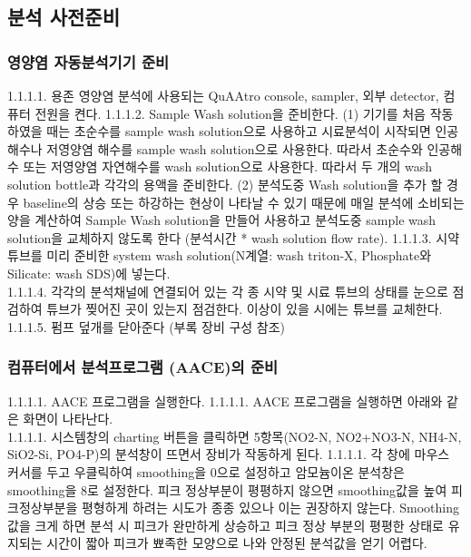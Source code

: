 \documentclass[
]{book}
\begin{document}
\hypertarget{uxbd84uxc11d-uxc0acuxc804uxc900uxbe44}{%
\subsection{분석 사전준비}\label{uxbd84uxc11d-uxc0acuxc804uxc900uxbe44}}

\hypertarget{uxc601uxc591uxc5fc-uxc790uxb3d9uxbd84uxc11duxae30uxae30-uxc900uxbe44}{%
\subsubsection{영양염 자동분석기기 준비}\label{uxc601uxc591uxc5fc-uxc790uxb3d9uxbd84uxc11duxae30uxae30-uxc900uxbe44}}

1.1.1.1. 용존 영양염 분석에 사용되는 QuAAtro console, sampler, 외부 detector, 컴퓨터 전원을 켠다.
1.1.1.2. Sample Wash solution을 준비한다.
(1) 기기를 처음 작동하였을 때는 초순수를 sample wash solution으로 사용하고 시료분석이 시작되면 인공해수나 저영양염 해수를 sample wash solution으로 사용한다. 따라서 초순수와 인공해수 또는 저영양염 자연해수를 wash solution으로 사용한다. 따라서 두 개의 wash solution bottle과 각각의 용액을 준비한다.
(2) 분석도중 Wash solution을 추가 할 경우 baseline의 상승 또는 하강하는 현상이 나타날 수 있기 때문에 매일 분석에 소비되는 양을 계산하여 Sample Wash solution을 만들어 사용하고 분석도중 sample wash solution을 교체하지 않도록 한다 (분석시간 * wash solution flow rate).
1.1.1.3. 시약튜브를 미리 준비한 system wash solution(N계열: wash triton-X, Phosphate와 Silicate: wash SDS)에 넣는다.\\
1.1.1.4. 각각의 분석채널에 연결되어 있는 각 종 시약 및 시료 튜브의 상태를 눈으로 점검하여 튜브가 찢어진 곳이 있는지 점검한다. 이상이 있을 시에는 튜브를 교체한다.
1.1.1.5. 펌프 덮개를 닫아준다 (부록 장비 구성 참조)

\hypertarget{uxcef4uxd4e8uxd130uxc5d0uxc11c-uxbd84uxc11duxd504uxb85cuxadf8uxb7a8-aaceuxc758-uxc900uxbe44}{%
\subsubsection{컴퓨터에서 분석프로그램 (AACE)의 준비}\label{uxcef4uxd4e8uxd130uxc5d0uxc11c-uxbd84uxc11duxd504uxb85cuxadf8uxb7a8-aaceuxc758-uxc900uxbe44}}

1.1.1.1. AACE 프로그램을 실행한다.
1.1.1.1. AACE 프로그램을 실행하면 아래와 같은 화면이 나타난다.\\
1.1.1.1. 시스템창의 charting 버튼을 클릭하면 5항목(NO2-N, NO2+NO3-N, NH4-N, SiO2-Si, PO4-P)의 분석창이 뜨면서 장비가 작동하게 된다.
1.1.1.1. 각 창에 마우스 커서를 두고 우클릭하여 smoothing을 0으로 설정하고 암모늄이온 분석창은 smoothing을 8로 설정한다. 피크 정상부분이 평평하지 않으면 smoothing값을 높여 피크정상부분을 평형하게 하려는 시도가 종종 있으나 이는 권장하지 않는다. Smoothing 값을 크게 하면 분석 시 피크가 완만하게 상승하고 피크 정상 부분의 평평한 상태로 유지되는 시간이 짧아 피크가 뾰족한 모양으로 나와 안정된 분석값을 얻기 어렵다.
\end{document}
